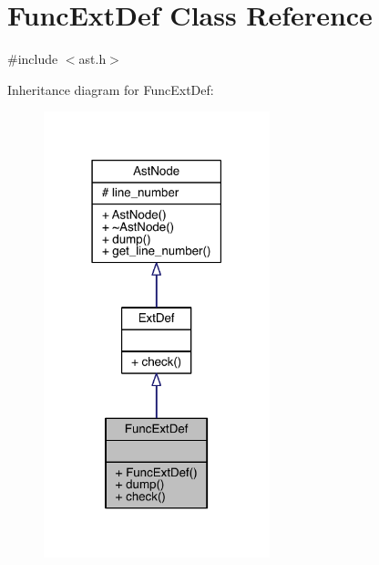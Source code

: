 \hypertarget{class_func_ext_def}{}\section{Func\+Ext\+Def Class Reference}
\label{class_func_ext_def}


{\ttfamily \#include $<$ast.\+h$>$}



Inheritance diagram for Func\+Ext\+Def\+:\nopagebreak
\begin{figure}[H]
\begin{center}
\leavevmode
\includegraphics[width=186pt]{class_func_ext_def__inherit__graph}
\end{center}
\end{figure}


